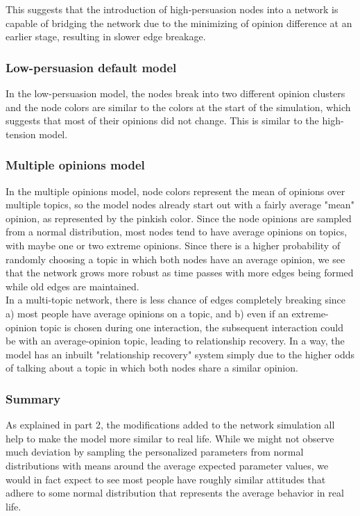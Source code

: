 \documentclass[11pt]{article}
\begin{document}
This suggests that the introduction of high-persuasion nodes into a
network is capable of bridging the network due to the minimizing of
opinion difference at an earlier stage, resulting in slower edge
breakage.

\subsubsection*{Low-persuasion default model}

In the low-persuasion model, the nodes break into two different opinion
clusters and the node colors are similar to the colors at the start of
the simulation, which suggests that most of their opinions did not
change. This is similar to the high-tension model.

\subsubsection*{Multiple opinions model}

In the multiple opinions model, node colors represent the mean of
opinions over multiple topics, so the model nodes already start out with
a fairly average "mean" opinion, as represented by the pinkish color.
Since the node opinions are sampled from a normal distribution, most
nodes tend to have average opinions on topics, with maybe one or two
extreme opinions. Since there is a higher probability of randomly
choosing a topic in which both nodes have an average opinion, we see
that the network grows more robust as time passes with more edges being
formed while old edges are maintained.\\

In a multi-topic network, there is less chance of edges completely
breaking since a) most people have average opinions on a topic, and b)
even if an extreme-opinion topic is chosen during one interaction, the
subsequent interaction could be with an average-opinion topic, leading
to relationship recovery. In a way, the model has an inbuilt
"relationship recovery" system simply due to the higher odds of talking
about a topic in which both nodes share a similar opinion.

\subsubsection*{Summary}

As explained in part 2, the modifications added to the network
simulation all help to make the model more similar to real life. While
we might not observe much deviation by sampling the personalized
parameters from normal distributions with means around the average
expected parameter values, we would in fact expect to see most people
have roughly similar attitudes that adhere to some normal distribution
that represents the average behavior in real life.\\
\end{document}

